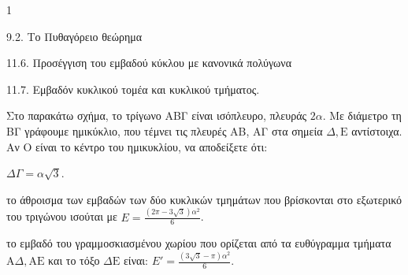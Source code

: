 \begin{ylh}{1}
    \item 9.2. Το Πυθαγόρειο θεώρημα
    \item 11.6. Προσέγγιση του εμβαδού κύκλου με κανονικά πολύγωνα
    \item 11.7. Εμβαδόν κυκλικού τομέα και κυκλικού τμήματος.
\end{ylh}
\begin{figure}
    \centering
\end{figure}
Στο παρακάτω σχήμα, το τρίγωνο ΑΒΓ είναι ισόπλευρο, πλευράς $2\alpha$. Με διάμετρο τη ΒΓ γράφουμε ημικύκλιο, που τέμνει τις πλευρές ΑΒ, ΑΓ στα σημεία $\Delta,\text{E}$ αντίστοιχα.
Αν Ο είναι το κέντρο του ημικυκλίου, να αποδείξετε ότι:
\begin{alist}
\item $\Delta\Gamma = \alpha\sqrt{3}$. 
\item το άθροισμα των εμβαδών των δύο κυκλικών τμημάτων που βρίσκονται στο εξωτερικό του τριγώνου ισούται με $E = \frac{(2\pi-3\sqrt{3})\alpha^2}{6}$. 
\item το εμβαδό του γραμμοσκιασμένου χωρίου που ορίζεται από τα ευθύγραμμα τμήματα $\text{A}\Delta, \text{AE}$ και το τόξο $\Delta\text{E}$ είναι: $E' = \frac{(3\sqrt{3}-\pi)\alpha^2}{6}$. 
\end{alist}